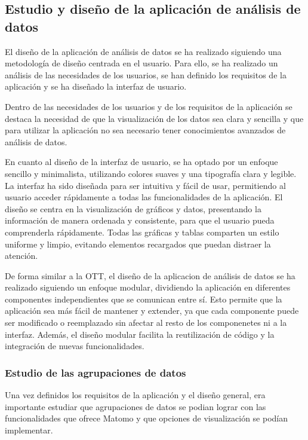 \subsection{Estudio y diseño de la aplicación de análisis de datos}
\label{sec:diseno-estudio}

El diseño de la aplicación de análisis de datos se ha realizado siguiendo una metodología de diseño centrada en el usuario. 
Para ello, se ha realizado un análisis de las necesidades de los usuarios, se han definido los requisitos de la aplicación 
y se ha diseñado la interfaz de usuario.

Dentro de las necesidades de los usuarios y de los requisitos de la aplicación se destaca la necesidad de que la visualización
de los datos sea clara y sencilla y que para utilizar la aplicación no sea necesario tener conocimientos avanzados de análisis de datos.

En cuanto al diseño de la interfaz de usuario, se ha optado por un enfoque sencillo y minimalista, utilizando colores suaves y 
una tipografía clara y legible. La interfaz ha sido diseñada para ser intuitiva y fácil de usar, permitiendo al usuario acceder 
rápidamente a todas las funcionalidades de la aplicación. El diseño se centra en la visualización de gráficos y datos, presentando 
la información de manera ordenada y consistente, para que el usuario pueda comprenderla rápidamente. Todas las gráficas y tablas 
comparten un estilo uniforme y limpio, evitando elementos recargados que puedan distraer la atención.

De forma similar a la OTT, el diseño de la aplicacion de análisis de datos se ha realizado siguiendo un enfoque modular,
dividiendo la aplicación en diferentes componentes independientes que se comunican entre sí. Esto permite que la aplicación sea
más fácil de mantener y extender, ya que cada componente puede ser modificado o reemplazado sin afectar al resto de los componenetes 
ni a la interfaz. Además, el diseño modular facilita la reutilización de código y la integración de nuevas funcionalidades.

\subsubsection{Estudio de las agrupaciones de datos}
\label{sec:diseno-agrupaciones}

Una vez definidos los requisitos de la aplicación y el diseño general, era importante estudiar que agrupaciones de datos 
se podian lograr con las funcionalidades que ofrece Matomo y que opciones de visualización se podían implementar. 

